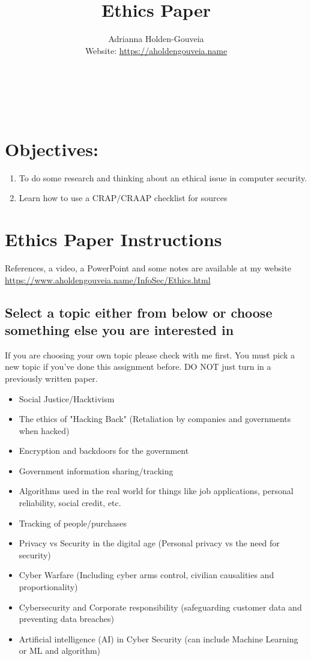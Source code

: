 \documentclass[12pt]{article}
\title{Ethics Paper}
\author{
        Adrianna Holden-Gouveia \\
        Website: \url{https://aholdengouveia.name}\\ 
        \date{\vspace{-5ex}}
        \faLinkedin{: aholdengouveia} \\
        \faGithub {: aholdengouveia} \\
        \faTwitter {: aholdengouveia} \\
        }
\begin{document}
    

\maketitle



\section*{Objectives:}
\begin{enumerate}
    \item To do some research and thinking about an ethical issue in computer security. 
    \item Learn how to use a CRAP/CRAAP checklist for sources
\end{enumerate}
\section*{Ethics Paper Instructions}

References, a video, a PowerPoint and some notes are available at my website
\url {https://www.aholdengouveia.name/InfoSec/Ethics.html}

\subsection*{Select a topic either from below or choose something else you are interested in}
If you are choosing your own topic please check with me first.  You must pick a new topic if you've done this assignment before.  DO NOT just turn in a previously written paper.
        
    \begin{itemize}
        \item Social Justice/Hacktivism
        \item The ethics of "Hacking Back" (Retaliation by companies and governments when hacked)
        \item Encryption and backdoors for the government
        \item Government information sharing/tracking
        \item Algorithms used in the real world for things like job applications, personal reliability, social credit, etc.
        \item Tracking of people/purchases
        \item Privacy vs Security in the digital age (Personal privacy vs the need for security)
        \item Cyber Warfare (Including cyber arms control, civilian causalities and proportionality)
        \item Cybersecurity and Corporate responsibility (safeguarding customer data and preventing data breaches)
        \item Artificial intelligence (AI) in Cyber Security (can include Machine Learning or ML and algorithm)


    \end{itemize}
\end{document}
